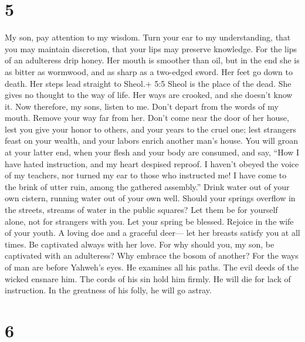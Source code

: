 \hypertarget{section-4}{%
\section{5}\label{section-4}}

 My son, pay attention to my wisdom. Turn your ear to my
understanding,  that you may maintain discretion, that your
lips may preserve knowledge.  For the lips of an adulteress
drip honey. Her mouth is smoother than oil,  but in the end
she is as bitter as wormwood, and as sharp as a two-edged sword.
 Her feet go down to death. Her steps lead straight to
Sheol.+ 5:5 Sheol is the place of the dead.  She gives no
thought to the way of life. Her ways are crooked, and she doesn't know
it.  Now therefore, my sons, listen to me. Don't depart from
the words of my mouth.  Remove your way far from her. Don't
come near the door of her house,  lest you give your honor
to others, and your years to the cruel one;  lest strangers
feast on your wealth, and your labors enrich another man's house.
 You will groan at your latter end, when your flesh and
your body are consumed,  and say, ``How I have hated
instruction, and my heart despised reproof.  I haven't
obeyed the voice of my teachers, nor turned my ear to those who
instructed me!  I have come to the brink of utter ruin,
among the gathered assembly.''  Drink water out of your own
cistern, running water out of your own well.  Should your
springs overflow in the streets, streams of water in the public squares?
 Let them be for yourself alone, not for strangers with
you.  Let your spring be blessed. Rejoice in the wife of
your youth.  A loving doe and a graceful deer--- let her
breasts satisfy you at all times. Be captivated always with her love.
 For why should you, my son, be captivated with an
adulteress? Why embrace the bosom of another?  For the ways
of man are before Yahweh's eyes. He examines all his paths.
 The evil deeds of the wicked ensnare him. The cords of his
sin hold him firmly.  He will die for lack of instruction.
In the greatness of his folly, he will go astray.

\hypertarget{section-5}{%
\section{6}\label{section-5}}

